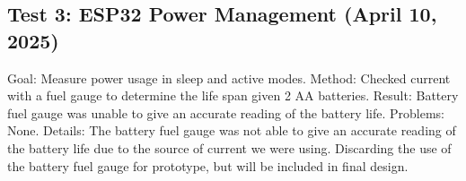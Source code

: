 \documentclass{article}
\begin{document}
\subsection*{Test 3: ESP32 Power Management (April 10, 2025)}
Goal: Measure power usage in sleep and active modes.
Method: Checked current with a fuel gauge to determine the life span given 2 AA batteries.
Result: Battery fuel gauge was unable to give an accurate reading of the battery life.
Problems: None.
Details: The battery fuel gauge was not able to give an accurate reading of the battery life due to the source of current we were using. Discarding the use of the battery fuel gauge for prototype, but will be included in final design.
\end{document}
